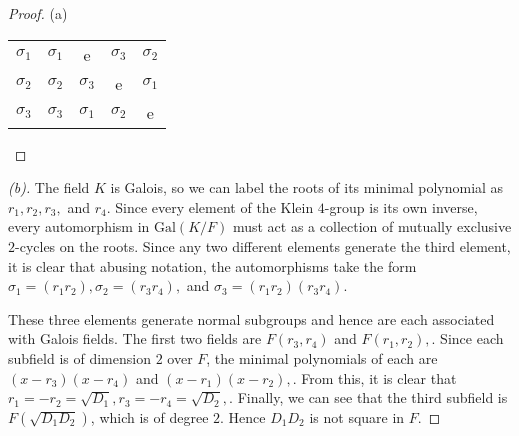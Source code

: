\documentclass[10pt]{article}
\newcommand{\Gal}{\text{Gal}}
\newenvironment{problem}[2][Problem]{\begin{trivlist}
		\item[\hskip \labelsep {\bfseries #1}\hskip \labelsep {\bfseries #2.}]}{\end{trivlist}}
\begin{document}
\begin{problem}{2.15}
\begin{proof}{(a)}
\begin{center}
\begin{tabular}{c | c c c c}
					$\sigma_1$  & $\sigma_1$ & e 		  & $\sigma_3$ & $\sigma_2$ \\
					$\sigma_2$  & $\sigma_2$ & $\sigma_3$ & e 		   & $\sigma_1$ \\
					$\sigma_3$ 	& $\sigma_3$ & $\sigma_1$ & $\sigma_2$ & e \\
				\end{tabular}
			\end{center} 
		\end{proof}
		\begin{proof}[(b)]
			The field $K$ is Galois, so we can label the roots of its minimal polynomial as $r_1, r_2, r_3,$ and $r_4$. Since every element of the Klein $4$-group is its own inverse, every automorphism in $\Gal(K/F)$ must act as a collection of mutually exclusive $2$-cycles on the roots. Since any two different elements generate the third element, it is clear that abusing notation, the automorphisms take the form $\sigma_1 = (r_1r_2), \sigma_2 = (r_3r_4),$ and $\sigma_3 = (r_1r_2)(r_3r_4)$. 
			
			These three elements generate normal subgroups and hence are each associated with Galois fields. The first two fields are $F(r_3, r_4)$ and $F(r_1, r_2),$. Since each subfield is of dimension $2$ over $F$, the minimal polynomials of each are $(x-r_3)(x-r_4)$ and $(x-r_1)(x-r_2),$. From this, it is clear that $r_1 = -r_2 = \sqrt{D_1}, r_3=-r_4=\sqrt{D_2},$. Finally, we can see that the third subfield is $F(\sqrt{D_1D_2})$, which is of degree $2$. Hence $D_1D_2$ is not square in $F$.	
		\end{proof}
	\end{problem}
	
\end{document}
